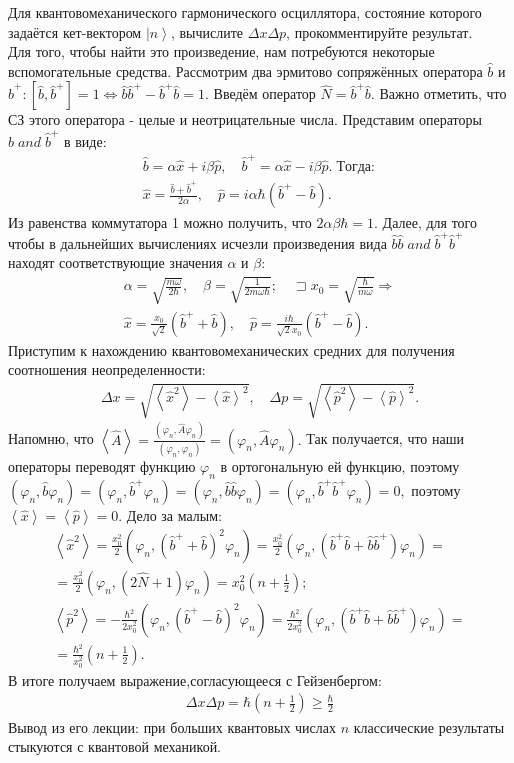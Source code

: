 \documentclass[__main__.tex]{subfiles}
\begin{document}
Для квантовомеханического гармонического осциллятора, состояние которого задаётся кет-вектором $\left|n\right>$, вычислите $\Delta x\Delta p$, прокомментируйте результат.\\

Для того, чтобы найти это произведение, нам потребуются некоторые вспомогательные средства. Рассмотрим два эрмитово сопряжённых оператора $\hat{b}$ и $\hat{b}^+: \left[\hat{b},\hat{b}^+\right]=1 \Leftrightarrow \hat{b}\hat{b}^+-\hat{b}^+\hat{b}=1.$ Введём оператор $\hat{N}=\hat{b}^+\hat{b}.$ Важно отметить, что СЗ этого оператора - целые и неотрицательные числа.
Представим операторы $\hat{b}\;and\;\hat{b}^+$ в виде:
\begin{gather*}
\hat{b}=\alpha\hat{x}+i\beta\hat{p},\quad
\hat{b}^+=\alpha\hat{x}-i\beta\hat{p}.\; Тогда:\\
\hat{x}=\frac{\hat{b}+\hat{b}^+}{2\alpha},\quad
\hat{p}=i\alpha\hbar\left(\hat{b}^+-\hat{b}\right).
\end{gather*}
Из равенства коммутатора 1 можно получить, что $2\alpha\beta\hbar=1.$ Далее, для того чтобы в дальнейших вычислениях исчезли произведения вида $\hat{b}\hat{b}\;and\;\hat{b}^+\hat{b}^+$ находят соответствующие значения $α$ и $β$:
\begin{gather*}
\alpha=\sqrt{\frac{m\omega}{2\hbar}},\quad\beta=\sqrt{\frac{1}{2m\omega\hbar}};\quad\sqsupset x_0=\sqrt{\frac{\hbar}{m\omega}}\Rightarrow\\
\hat{x}=\frac{x_0}{\sqrt{2}}\left(\hat b^++\hat b\right),\quad \hat p=\frac{i\hbar}{\sqrt{2}x_0}\left(\hat b^+-\hat b\right).
\end{gather*}
Приступим к нахождению квантовомеханических средних для получения соотношения неопределенности:
\begin{gather*}
\Delta x=\sqrt{\left<\hat x^2\right>-\left<\hat x\right>^2},\quad
\Delta p=\sqrt{\left<\hat p^2\right>-\left<\hat p\right>^2}.
\end{gather*}
Напомню, что $\left<\hat A\right>=\frac{\left(\varphi_n,\hat A\varphi_n\right)}{\left(\varphi_n,\varphi_n\right)}=\left(\varphi_n,\hat A\varphi_n\right).$ Так получается, что наши операторы переводят функцию $\varphi_n$ в ортогональную ей функцию, поэтому $(\varphi_n,\hat b\varphi_n)=(\varphi_n,\hat b^+\varphi_n)=(\varphi_n,\hat b\hat b\varphi_n)=(\varphi_n,\hat b^+\hat b^+\varphi_n)=0,$ поэтому $\left<\hat x\right>=\left<\hat p\right>=0.$ Дело за малым:
\begin{gather*}
\left<\hat x^2\right>=\frac{x_0^2}{2}(\varphi_n,(\hat b^++\hat b)^2\varphi_n)=\frac{x_0^2}{2}(\varphi_n,(\hat b^+\hat b+\hat b\hat b^+)\varphi_n)=\\
=\frac{x_0^2}{2}(\varphi_n,(2\hat N+1)\varphi_n)=x_0^2\left(n+\frac{1}{2}\right);\\
\left<\hat p^2\right>=-\frac{\hbar^2}{2x_0^2}(\varphi_n,(\hat b^+-\hat b)^2\varphi_n)=\frac{\hbar^2}{2x_0^2}(\varphi_n,(\hat b^+\hat b+\hat b\hat b^+)\varphi_n)=\\
=\frac{\hbar^2}{x_0^2}\left(n+\frac{1}{2}\right).
\end{gather*}
В итоге получаем выражение,согласующееся с Гейзенбергом:
\begin{gather*}
\Delta x\Delta p=\hbar\left(n+\frac{1}{2}\right)\ge\frac{\hbar}{2}
\end{gather*}
Вывод из его лекции: при больших квантовых числах $n$ классические результаты стыкуются с квантовой механикой.
\end{document}
